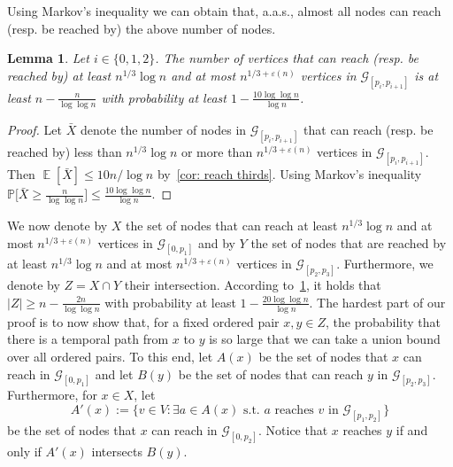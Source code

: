 \documentclass[a4paper,11pt]{article}
\theoremstyle{definition}
\theoremstyle{plain}
\newtheorem{lemma}{Lemma}
\DeclareMathOperator{\E}{\mathbb{E}}
\let\eps\varepsilon
\newcommand{\GGG}{\mathcal{G}}
\newcommand{\prob}{\mathbb{P}}
\renewcommand{\Pr}{\prob}
\begin{document}
Using Markov's inequality we can obtain that, a.a.s., almost all nodes can reach (resp. be reached by) the above number of nodes.
\begin{lemma}
\label{lemma: almost everyone reaches many}
				Let $i\in \{0, 1, 2\}$. The number of vertices that can reach (resp. be reached by) at least $n^{1/3}\log n$ and at most $n^{1/3 + \eps(n)}$ vertices in $\GGG_{[p_i, p_{i+1}]}$ is at least $n - \frac{n}{\log \log n}$ with probability at least $1 - \frac{10 \log \log n}{\log n}$.
\end{lemma}
\begin{proof}
				Let $\bar X$ denote the number of nodes in $\GGG_{[p_i, p_{i+1}]}$ that can reach (resp. be reached by) less than $n^{1/3}\log n$ or more than $n^{1/3 + \eps(n)}$ vertices in $\GGG_{[p_i, p_{i+1}]}$. Then $\E[\bar X] \le 10n /\log n$ by~\cref{cor: reach thirds}. Using Markov's inequality
        $
            \Pr\Big[\bar X \geq \frac{n}{\log\log n}\Big]
            \le \frac{10 \log \log n}{\log n}.
        $
\end{proof}
We now denote by $X$ the set of nodes that can reach at least $n^{1/3}\log n$ and at most $n^{1/3 + \eps(n)}$ vertices in $\GGG_{[0, p_{1}]}$ and by $Y$ the set of nodes that are reached by at least $n^{1/3}\log n$ and at most $n^{1/3 + \eps(n)}$ vertices in $\GGG_{[p_2, p_{3}]}$. Furthermore, we denote by $Z=X\cap Y$ their intersection.
According to~\cref{lemma: almost everyone reaches many}, it holds that $|Z|\ge n - \frac{2n}{\log \log n}$ with probability at least $1 - \frac{20 \log \log n}{\log n}$.
The hardest part of our proof is to now show that, for a fixed ordered pair $x,y\in Z$, the probability that there is a temporal path from $x$ to $y$ is so large that we can take a union bound over all ordered pairs. To this end, let $A(x)$ be the set of nodes that $x$ can reach in $\GGG_{[0,p_1]}$ and let $B(y)$ be the set of nodes that can reach $y$ in $\GGG_{[p_2, p_3]}$. Furthermore, for $x\in X$, let
\[
    A'(x):=\{v\in V: \exists a\in A(x) \text{ s.t.\ }a \text{ reaches } v \text{ in }\GGG_{[p_1, p_2]}\}
\]
be the set of nodes that $x$ can reach in $\GGG_{[0, p_2]}$.
Notice that $x$ reaches $y$ if and only if $A'(x)$ intersects $B(y)$.
\end{document}
